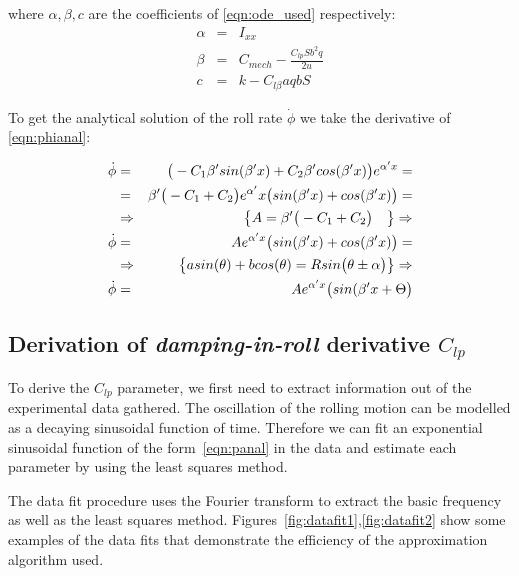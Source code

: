 where $\alpha, \beta, c$ are the coefficients of \ref{eqn:ode_used} respectively:
\begin{eqnarray}
    \alpha &=& I_{xx} \label{eqn:alpha}\\
    \beta &=&  C_{mech} - \frac{C_{lp}Sb^2q}{2u} \label{eqn:beta}\\
    c &=&  k - C_{l\beta}aqbS \label{eqn:c}
\end{eqnarray}

%
%
%
%

\noindent To get the analytical solution of the roll rate $\dot{\phi}$ we take the derivative 
of \ref{eqn:phianal}:

\begin{eqnarray}
    \dot{\phi} &=&   \big(-C_1 \beta' sin(\beta' x) + C_2 \beta' cos(\beta' x) \big) e^{\alpha' x} =\notag\\
     &=&  \beta'\big(-C_1+C_2\big)e^{\alpha'}x\big(sin(\beta'x) + cos(\beta'x)\big) = \notag\\
     &\Rightarrow& \big\{A = \beta' \big(-C_1+C_2\big) \quad \big\} \Rightarrow \notag\\
     \dot{\phi} &=& Ae^{\alpha'x}\big(sin(\beta'x) + cos(\beta'x)\big) \label{eqn:panal} = \notag\\
     &\Rightarrow&  \big\{asin(\theta) + bcos(\theta) = Rsin\big(\theta \pm \alpha\big)\big\}\Rightarrow \notag\\
     \dot{\phi} &=& Ae^{\alpha'x}\big(sin(\beta'x + \Theta \big) \label{eqn:panal} \label{eqn:panal}
\end{eqnarray}

\subsection{Derivation of \textit{damping-in-roll} derivative $C_{lp}$}

To derive the $C_{lp}$ parameter, we first need to extract information out of 
the experimental data gathered. The oscillation of the rolling motion can be modelled as a 
decaying sinusoidal function of time. Therefore we can fit an exponential sinusoidal function 
of the form~\ref{eqn:panal} in the data and estimate each parameter 
by using the least squares method.

The data fit procedure uses the Fourier transform to extract the basic frequency as well as the least squares method.
Figures~\ref{fig:datafit1},\ref{fig:datafit2} show some examples of the data fits that demonstrate the efficiency of the 
approximation algorithm used.

